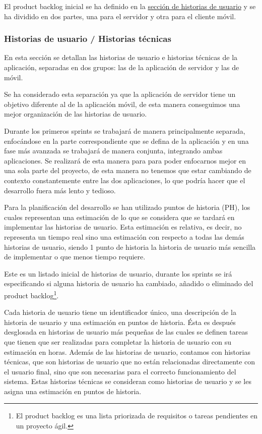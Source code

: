 El product backlog inicial se ha definido en la \hyperref[sec:historias-de-usuario]{sección de historias de usuario} y se ha dividido en dos partes, una para el servidor y otra para el cliente móvil.

\subsubsection{Historias de usuario / Historias técnicas}
\label{sec:historias-de-usuario}
En esta sección se detallan las historias de usuario e historias técnicas de la aplicación, separadas en dos grupos: las de la aplicación de servidor y las de móvil.

Se ha considerado esta separación ya que la aplicación de servidor tiene un objetivo diferente al de la aplicación móvil, de esta manera conseguimos una mejor organización de las historias de usuario.

Durante los primeros sprints se trabajará de manera principalmente separada, enfocándose en la parte correspondiente que se defina de la aplicación y en una fase más avanzada se trabajará de manera conjunta, integrando ambas aplicaciones. Se realizará de esta manera para para poder enfocarnos mejor en una sola parte del proyecto, de esta manera no tenemos que estar cambiando de contexto constantemente entre las dos aplicaciones, lo que podría hacer que el desarrollo fuera más lento y tedioso.

Para la planificación del desarrollo se han utilizado puntos de historia (PH), los cuales representan una estimación de lo que se considera que se tardará en implementar las historias de usuario. Esta estimación es relativa, es decir, no representa un tiempo real sino una estimación con respecto a todas las demás historias de usuario, siendo 1 punto de historia la historia de usuario más sencilla de implementar o que menos tiempo requiere.

Este es un listado inicial de historias de usuario, durante los sprints se irá especificando si alguna historia de usuario ha cambiado, añadido o eliminado del product backlog\footnote{El product backlog es una lista priorizada de requisitos o tareas pendientes en un proyecto ágil.}.

Cada historia de usuario tiene un identificador único, una descripción de la historia de usuario y una estimación en puntos de historia. Ésta es después desglosada en historias de usuario más pequeñas de las cuales se definen tareas que tienen que ser realizadas para completar la historia de usuario con su estimación en horas.
Además de las historias de usuario, contamos con historias técnicas, que son historias de usuario que no están relacionadas directamente con el usuario final, sino que son necesarias para el correcto funcionamiento del sistema. Estas historias técnicas se consideran como historias de usuario y se les asigna una estimación en puntos de historia.

